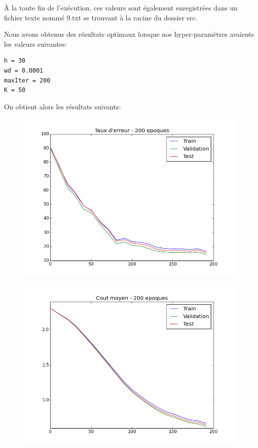 \documentclass[a4paper,11pt]{article}
\begin{document}
À la toute fin de l'exécution, ces valeurs sont également enregistrées dans un fichier texte nommé 9.txt se trouvant à la racine du dossier src.

\newpage

Nous avons obtenus des résultats optimaux lorsque nos hyper-paramètres avaients les valeurs suivantes:

\begin{verbatim}
h = 30
wd = 0.0001
maxIter = 200
K = 50
\end{verbatim}

On obtient alors les résultats suivants:

\begin{figure}[H]
	\includegraphics[width=15cm]{images/best_taux_erreur.png}
	\centering
	\label{fig:comp}
\end{figure}

\begin{figure}[H]
	\includegraphics[width=15cm]{images/best_cout_moyen.png}
	\centering
	\label{fig:comp}
\end{figure}
\end{document}
